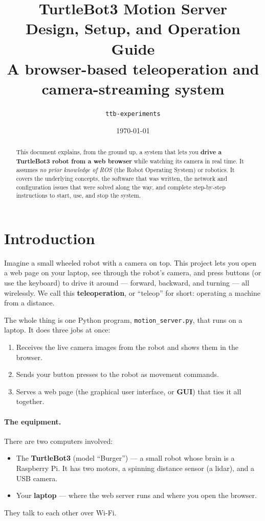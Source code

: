 \documentclass[11pt,a4paper]{article}
\title{\vspace{-1cm}\textbf{TurtleBot3 Motion Server}\\[4pt]
       \large Design, Setup, and Operation Guide\\[2pt]
       \normalsize A browser-based teleoperation and camera-streaming system}
\author{\texttt{ttb-experiments}}
\date{\today}
\newcommand{\code}[1]{\texttt{#1}}
\begin{document}
\maketitle
\thispagestyle{empty}

\begin{abstract}
\noindent This document explains, from the ground up, a system that lets you
\textbf{drive a TurtleBot3 robot from a web browser} while watching its camera
in real time. It assumes \emph{no prior knowledge of ROS} (the Robot Operating
System) or robotics. It covers the underlying concepts, the software that was
written, the network and configuration issues that were solved along the way,
and complete step-by-step instructions to start, use, and stop the system.
\end{abstract}

\tableofcontents
\newpage

\section{Introduction}
Imagine a small wheeled robot with a camera on top. This project lets you open
a web page on your laptop, see through the robot's camera, and press buttons
(or use the keyboard) to drive it around --- forward, backward, and turning ---
all wirelessly. We call this \textbf{teleoperation}, or ``teleop'' for short:
operating a machine from a distance.

The whole thing is one Python program, \code{motion\_server.py}, that runs on a
laptop. It does three jobs at once:
\begin{enumerate}[noitemsep]
  \item Receives the live camera images from the robot and shows them in the browser.
  \item Sends your button presses to the robot as movement commands.
  \item Serves a web page (the graphical user interface, or \textbf{GUI}) that
        ties it all together.
\end{enumerate}

\paragraph{The equipment.} There are two computers involved:
\begin{itemize}[noitemsep]
  \item The \textbf{TurtleBot3} (model ``Burger'') --- a small robot whose brain
        is a Raspberry Pi. It has two motors, a spinning distance sensor
        (a lidar), and a USB camera.
  \item Your \textbf{laptop} --- where the web server runs and where you open the
        browser.
\end{itemize}
They talk to each other over Wi-Fi.
\end{document}
